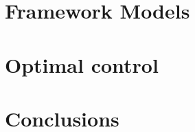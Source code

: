 \documentclass[phd, logo, twoside]{infthesis}
\begin{document}
\chapter{Framework Models}
\label{chp:fms}


\chapter{Optimal control}
\label{chp:oc}


\chapter{Conclusions}
\label{chp:concl}



\singlespace

% 

\printbibliography[heading=bibintoc]

\end{document}
